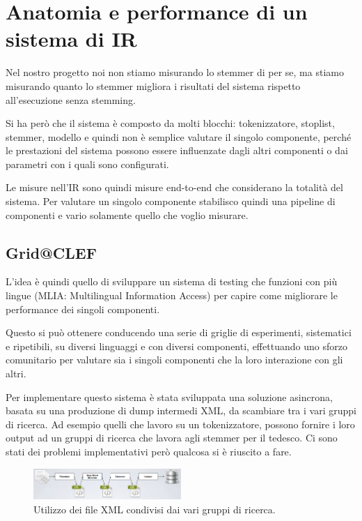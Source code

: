 

\chapter{Anatomia e performance di un sistema di IR}

Nel nostro progetto noi non stiamo misurando lo stemmer di per se, ma stiamo misurando quanto lo stemmer migliora i risultati del sistema rispetto all'esecuzione senza stemming.

Si ha però che il sistema è composto da molti blocchi: tokenizzatore, stoplist, stemmer, modello e quindi non è semplice valutare il singolo componente, perché le prestazioni del sistema possono essere influenzate dagli altri componenti o dai parametri con i quali sono configurati.

Le misure nell'IR sono quindi misure end-to-end che considerano la totalità del sistema. Per valutare un singolo componente stabilisco quindi una pipeline di componenti e vario solamente quello che voglio misurare.

\section{Grid@CLEF}

L'idea è quindi quello di sviluppare un sistema di testing che funzioni con più lingue (MLIA: Multilingual Information Access) per capire come migliorare le performance dei singoli componenti.

Questo si può ottenere conducendo una serie di griglie di esperimenti, sistematici e ripetibili, su diversi linguaggi e con diversi componenti, effettuando uno sforzo comunitario per valutare sia i singoli componenti che la loro interazione con gli altri.

Per implementare questo sistema è stata sviluppata una soluzione asincrona, basata su una produzione di dump intermedi XML, da scambiare tra i vari gruppi di ricerca. Ad esempio quelli che lavoro su un tokenizzatore, possono fornire i loro output ad un gruppi di ricerca che lavora agli stemmer per il tedesco.
Ci sono stati dei problemi implementativi però qualcosa si è riuscito a fare.

\begin{figure}[htbp]
	\centering
	\includegraphics[width=0.5\textwidth]{images/l20-fig-1}
	\caption{Utilizzo dei file XML condivisi dai vari gruppi di ricerca.}
\end{figure} 

